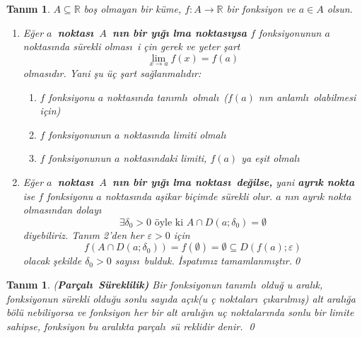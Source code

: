 \documentclass[12pt]{article}
\newtheorem{definition}[theorem]{Tan\i m}
\begin{document}
\begin{definition}
$A\subseteq 
\mathbb{R}
$ bo\c{s} olmayan bir k\"{u}me, $f:A\rightarrow 
\mathbb{R}
$ bir fonksiyon ve $a\in A$ olsun.

\begin{enumerate}
\item E\u{g}er $a$\textbf{\ noktas\i\ }$A$\textbf{\ n\i n bir y\i \u{g}\i
lma noktas\i ysa} $f$ fonksiyonunun $a$ noktas\i nda s\"{u}rekli olmas\i\ i%
\c{c}in gerek ve yeter \c{s}art 
\[
\lim_{x\rightarrow a}f(x)=f(a)
\]%
olmas\i d\i r. Yani \c{s}u \"{u}\c{c} \c{s}art sa\u{g}lanmal\i d\i r:

\begin{enumerate}
\item $f$ fonksiyonu $a$ noktas\i nda tan\i ml\i\ olmal\i\ ($f(a)$ n\i n
anlaml\i\ olabilmesi i\c{c}in)

\item $f$ fonksiyonunun $a$ noktas\i nda limiti olmal\i 

\item $f$ fonksiyonunun $a$ noktas\i ndaki limiti, $f(a)$ ya e\c{s}it
olmal\i 
\end{enumerate}

\item E\u{g}er $a$\textbf{\ noktas\i\ }$A$\textbf{\ n\i n bir y\i \u{g}\i
lma noktas\i\ de\u{g}ilse,} yani \textbf{ayr\i k nokta} ise $f$ fonksiyonu $a
$ noktas\i nda a\c{s}ikar bi\c{c}imde s\"{u}rekli olur. $a$ n\i n ayr\i k
nokta olmas\i ndan dolay\i\ 
\[
\exists \delta _{0}>0\text{ \"{o}yle ki }A\cap D(a;\delta _{0})=\emptyset 
\]%
diyebiliriz. Tan\i m 2'den her $\varepsilon >0$ i\c{c}in%
\[
f(A\cap D(a;\delta _{0}))=f(\emptyset )=\emptyset \subseteq
D(f(a);\varepsilon )
\]%
olacak \c{s}ekilde $\delta _{0}>0$ say\i s\i\ bulduk. \.{I}spat\i m\i z
tamamlanm\i \c{s}t\i r.\qed
\end{enumerate}
\end{definition}

\begin{definition}
(\textbf{Par\c{c}al\i\ S\"{u}reklilik) }Bir fonksiyonun tan\i ml\i\ oldu\u{g}%
u aral\i k, fonksiyonun s\"{u}rekli oldu\u{g}u sonlu say\i da a\c{c}\i k(u%
\c{c} noktalar\i\ \c{c}\i kar\i lm\i \c{s}) alt aral\i \u{g}a b\"{o}l\"{u}%
nebiliyorsa ve fonksiyon her bir alt aral\i \u{g}\i n u\c{c} noktalar\i nda
sonlu bir limite sahipse, fonksiyon bu aral\i kta par\c{c}al\i\ s\"{u}%
reklidir denir. \qed
\end{definition}
\end{document}
